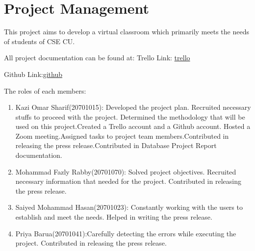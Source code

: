 \section{Project Management}\label{sec:projectmanagement}
This project aims to develop a virtual classroom which primarily meets the needs of students of CSE CU. 


All project documentation can be found at:
Trello Link: \href{https://trello.com/b/JfOtRvVs/project-idea}{trello} 

Github Link:\href{https://github.com/Sharif37/CU-Virtual-Classroom-}{github} 




The roles of each members:
\begin{enumerate}


\item Kazi Omar Sharif(20701015): Developed the project plan. Recruited necessary stuffs to proceed with the project. Determined the methodology that will be used on this project.Created a  Trello account and a Github account. Hosted a Zoom meeting.Assigned tasks to project team members.Contributed in releasing the press release.Contributed in  Database Project Report documentation. 

\item Mohammad Fazly Rabby(20701070): Solved project objectives. Recruited necessary information that needed for the project. Contributed in releasing the press release. 

\item Saiyed Mohammad Hasan(20701023): Constantly working with the users to establish and meet the needs. Helped in writing the press release.  

\item Priya Barua(20701041):Carefully detecting the errors while executing the project. Contributed in releasing the press release. 
\end{enumerate}
\clearpage